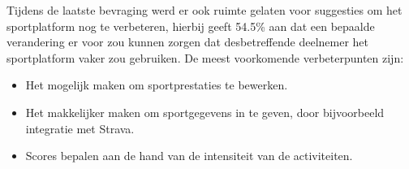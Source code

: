 Tijdens de laatste bevraging werd er ook ruimte gelaten voor suggesties om het sportplatform nog te verbeteren, hierbij geeft 54.5\% aan dat een bepaalde verandering er voor zou kunnen zorgen dat desbetreffende deelnemer het sportplatform vaker zou gebruiken. De meest voorkomende verbeterpunten zijn:

\begin{itemize}
  \item Het mogelijk maken om sportprestaties te bewerken.
  \item Het makkelijker maken om sportgegevens in te geven, door bijvoorbeeld integratie met Strava.
  \item Scores bepalen aan de hand van de intensiteit van de activiteiten.
\end{itemize}